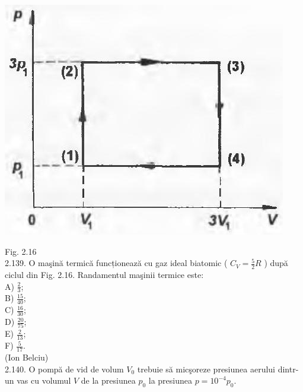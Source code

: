 \documentclass[10pt]{article}
\begin{document}
\includegraphics[max width=\textwidth, center]{2025_07_01_5b3ff9fa0d508c8e9f17g-104}

Fig. 2.16\\
2.139. O maşină termică funcționează cu gaz ideal biatomic ( $C_{V}=\frac{5}{2} R$ ) după ciclul din Fig. 2.16. Randamentul maşinii termice este:\\
A) $\frac{2}{3}$;\\
B) $\frac{15}{40}$;\\
C) $\frac{16}{30}$;\\
D) $\frac{20}{75}$;\\
E) $\frac{2}{13}$;\\
F) $\frac{5}{17}$.\\
(Ion Belciu)\\
2.140. O pompă de vid de volum $V_{0}$ trebuie să micşoreze presiunea aerului dintr-un vas cu volumul $V$ de la presiunea $p_{0}$ la presiunea $p=10^{-4} p_{0}$.
\end{document}
